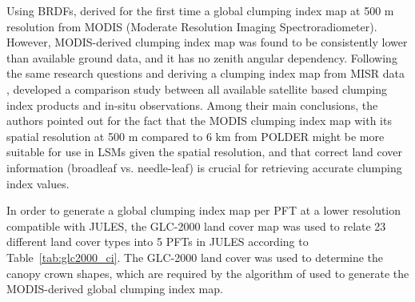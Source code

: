 Using BRDFs, \citet{He2012} derived for the first time a global clumping index map at 500 m resolution from MODIS (Moderate Resolution Imaging Spectroradiometer). However, MODIS-derived clumping index map was found to be consistently lower than available ground data, and it has no zenith angular dependency. Following the same research questions and deriving a clumping index map from MISR data \citep{Pisek2013}, \citet{Pisek2015} developed a comparison study between all available satellite based clumping index products and in-situ observations. Among their main conclusions, the authors pointed out for the fact that the MODIS clumping index map \citep{He2012} with its spatial resolution at 500 m compared to 6 km from POLDER might be more suitable for use in LSMs given the spatial resolution, and that correct land cover information (broadleaf vs. needle-leaf) is crucial for retrieving accurate clumping index values.

In order to generate a global clumping index map per PFT at a lower resolution compatible with JULES, the GLC-2000 land cover map \citep{Bartholome2005} was used to relate 23 different land cover types into 5 PFTs in JULES according to Table~\ref{tab:glc2000_ci}. The GLC-2000 land cover was used to determine the canopy crown shapes, which are required by the algorithm of \citet{Chen2005} used to generate the MODIS-derived global clumping index map. 

